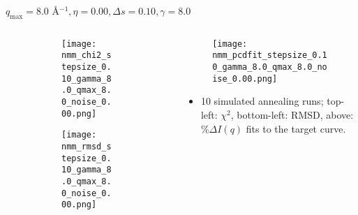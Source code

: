 \documentclass{beamer}
\begin{document}
\begin{frame}{$ q_{\textrm{max}}=8.0 $ \AA $^{-1}, \eta=0.00, \Delta s=0.10, \gamma=8.0$}
	\begin{columns}
		\begin{column}{.5\textwidth}
			\begin{figure}[H]
			\centering
			\begin{subfigure}[b]{\textwidth}
				\centering
				\texttt{[image: nmm\_chi2\_stepsize\_0.10\_gamma\_8.0\_qmax\_8.0\_noise\_0.00.png]}
				\label{fig:}
			\end{subfigure}
			\begin{subfigure}[b]{\textwidth}
				\centering
				\texttt{[image: nmm\_rmsd\_stepsize\_0.10\_gamma\_8.0\_qmax\_8.0\_noise\_0.00.png]}
				\label{fig:}
			\end{subfigure}
			\end{figure}
		\end{column}
		\begin{column}{.5\textwidth}
			\begin{figure}[H]
				\centering
				\texttt{[image: nmm\_pcdfit\_stepsize\_0.10\_gamma\_8.0\_qmax\_8.0\_noise\_0.00.png]}
				\label{fig:}
			\end{figure}
			\begin{itemize}
				\item 10 simulated annealing runs; top-left: $\chi^2$, bottom-left: RMSD, above: $\%\Delta I(q)$ fits to the target curve.
			\end{itemize}
		\end{column}
	\end{columns}
\end{frame}
 
\end{document}
